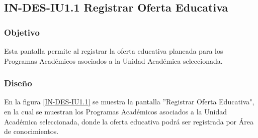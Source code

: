 \subsection{IN-DES-IU1.1 Registrar Oferta Educativa}

\subsubsection{Objetivo}

Esta pantalla permite al  registrar la oferta educativa planeada para los Programas Académicos asociados a la Unidad Académica seleccionada.

\subsubsection{Diseño}

En la figura \ref{IN-DES-IU1.1} se muestra la pantalla ''Registrar Oferta Educativa", en la cual se muestran los Programas Académicos asociados a la Unidad Académica seleccionada, donde la oferta educativa podrá ser registrada por Área de conocimientos.

